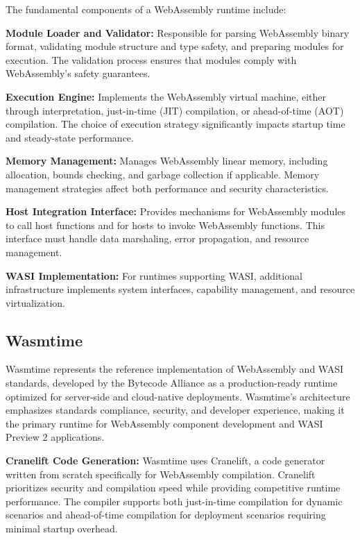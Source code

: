 
The fundamental components of a WebAssembly runtime include:

\textbf{Module Loader and Validator:} Responsible for parsing WebAssembly binary format, validating module structure and type safety, and preparing modules for execution. The validation process ensures that modules comply with WebAssembly's safety guarantees.

\textbf{Execution Engine:} Implements the WebAssembly virtual machine, either through interpretation, just-in-time (JIT) compilation, or ahead-of-time (AOT) compilation. The choice of execution strategy significantly impacts startup time and steady-state performance.

\textbf{Memory Management:} Manages WebAssembly linear memory, including allocation, bounds checking, and garbage collection if applicable. Memory management strategies affect both performance and security characteristics.

\textbf{Host Integration Interface:} Provides mechanisms for WebAssembly modules to call host functions and for hosts to invoke WebAssembly functions. This interface must handle data marshaling, error propagation, and resource management.

\textbf{WASI Implementation:} For runtimes supporting WASI, additional infrastructure implements system interfaces, capability management, and resource virtualization.

\subsection{Wasmtime}
\label{subsec:wasmtime}

Wasmtime represents the reference implementation of WebAssembly and WASI standards, developed by the Bytecode Alliance as a production-ready runtime optimized for server-side and cloud-native deployments\cite{wasmtime_project}. Wasmtime's architecture emphasizes standards compliance, security, and developer experience, making it the primary runtime for WebAssembly component development and WASI Preview 2 applications.


\textbf{Cranelift Code Generation:} Wasmtime uses Cranelift, a code generator written from scratch specifically for WebAssembly compilation. Cranelift prioritizes security and compilation speed while providing competitive runtime performance. The compiler supports both just-in-time compilation for dynamic scenarios and ahead-of-time compilation for deployment scenarios requiring minimal startup overhead.


